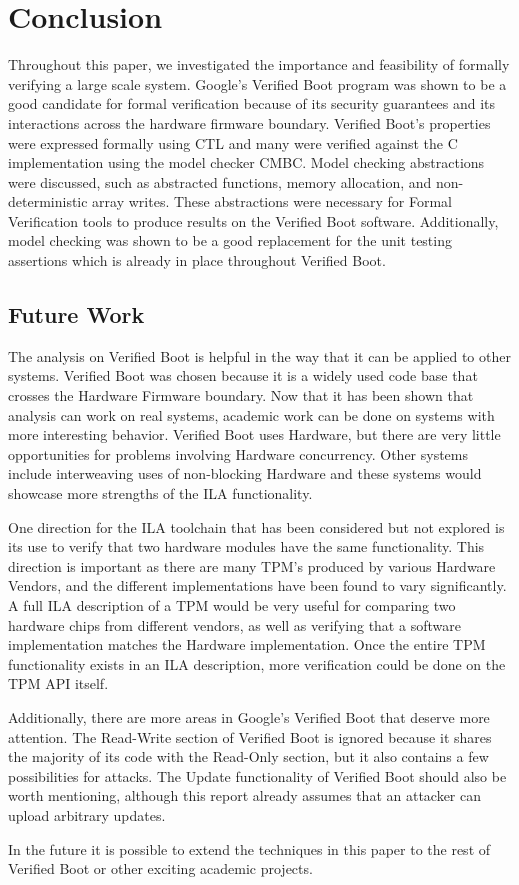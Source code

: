 \chapter{Conclusion}

Throughout this paper, we investigated the importance and feasibility of formally verifying a large scale system.
Google's Verified Boot program was shown to be a good candidate for formal verification because of its security guarantees and its interactions across the hardware firmware boundary.
Verified Boot's properties were expressed formally using CTL and many were verified against the C implementation using the model checker CMBC\@. 
Model checking abstractions were discussed, such as abstracted functions, memory
allocation, and non-deterministic array writes.
These abstractions were necessary for Formal Verification tools to produce
results on the Verified Boot software.
Additionally, model checking was shown to be a good replacement for the unit
testing assertions which is already in place throughout Verified Boot.

\section{Future Work}

The analysis on Verified Boot is helpful in the way that it can be applied to
other systems. 
Verified Boot was chosen because it is a widely used code base
that crosses the Hardware Firmware boundary. 
Now that it has been shown that analysis can work on real systems, academic
work can be done on systems with more interesting behavior.
Verified Boot uses Hardware, but there are very little opportunities for
problems involving Hardware concurrency.
Other systems include interweaving uses of non-blocking
Hardware\cite{load-protocol} and these systems would showcase more strengths of the ILA functionality. 

One direction for the ILA toolchain that has been considered but not explored
is its use to verify that two hardware modules have the same functionality.
This direction is important as there are many TPM's produced by various Hardware
Vendors\cite{atmel-tpm}\cite{broadcom-tpm}\cite{infineon-tpm}, and the different 
implementations have been found to vary significantly\cite{tcg-inside}.
A full ILA description of a TPM would be very useful for comparing two hardware
chips from different vendors, as well as verifying that a software
implementation matches the Hardware implementation. 
Once the entire TPM functionality exists in an ILA description, more
verification could be done on the TPM API
itself\cite{TPM-state}\cite{TPM-spec-verif}.

Additionally, there are more areas in Google's Verified Boot that
deserve more attention. 
The Read-Write section of Verified Boot is ignored because it shares the
majority of its code with the Read-Only section, but it also contains a few
possibilities for attacks.
The Update functionality of Verified Boot should also be worth mentioning,
although this report already assumes that an attacker can upload arbitrary
updates.

In the future it is possible to extend the techniques in this paper to the rest of
Verified Boot or other exciting academic projects.
